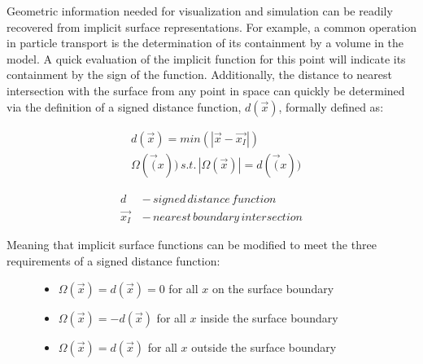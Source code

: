 Geometric information needed for visualization and simulation can be
readily recovered from implicit surface representations. For example, a common
operation in particle transport is the determination of its containment by a
volume in the model. A quick evaluation of the implicit function for this point
will indicate its containment by the sign of the function.
Additionally, the distance to nearest intersection with the surface from any
point in space can quickly be determined via the definition of a signed distance
function, $d(\vec{x})$, formally defined as:

\begin{align}
  & d(\vec{x}) = min(|\vec{x} - \vec{x_{I}}|) \\
  & \Omega(\vec(x))  \,s.t.  \,|\Omega(\vec{x})| = d(\vec(x)) 
\end{align}

\begin{align}
  d \, &- \, signed \, distance \, function \\
  \vec{x_{I}} \, &- \,nearest \, boundary \,intersection
\end{align}

\noindent
Meaning that implicit surface functions can be modified to meet the three
requirements of a signed distance function:

\begin{figure}[H]
  \begin{center}
    \begin{minipage}{.8\textwidth}
      \begin{itemize}
      \item $ \Omega(\vec{x}) = d(\vec{x}) = 0 $ for all $x$ on the surface boundary
      \item $ \Omega(\vec{x}) = -d(\vec{x}) $ for all $x$ inside the surface boundary
      \item $ \Omega(\vec{x}) = d(\vec{x}) $ for all $x$ outside the surface boundary
      \end{itemize}
    \end{minipage}
  \end{center}
\end{figure}

